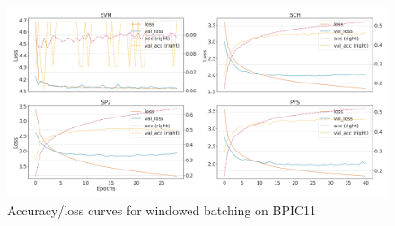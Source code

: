 \begin{figure}[!htb]
    \centering
    \includegraphics[width=\textwidth]{gfx/bpic2011/windowed_loss_acc_curve.png}
    \caption{Accuracy/loss curves for windowed batching on BPIC11}
\end{figure}
\FloatBarrier

